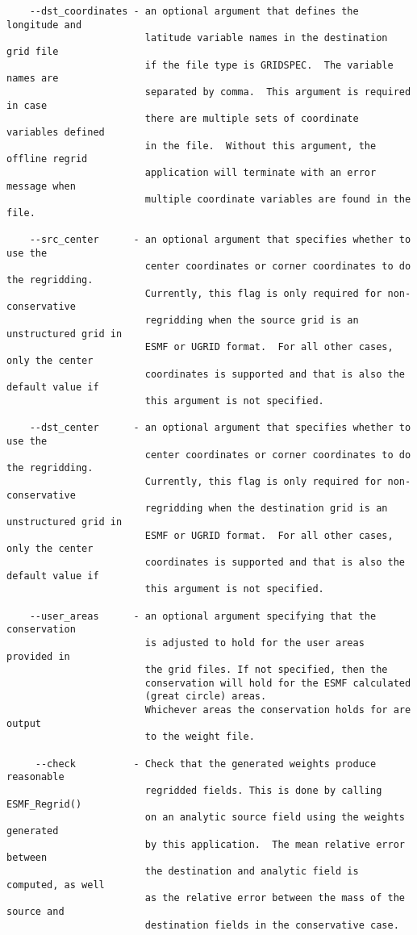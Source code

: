\begin{verbatim}
    --dst_coordinates - an optional argument that defines the longitude and
                        latitude variable names in the destination grid file
                        if the file type is GRIDSPEC.  The variable names are
                        separated by comma.  This argument is required in case
                        there are multiple sets of coordinate variables defined
                        in the file.  Without this argument, the offline regrid
                        application will terminate with an error message when
                        multiple coordinate variables are found in the file.

    --src_center      - an optional argument that specifies whether to use the 
                        center coordinates or corner coordinates to do the regridding.
                        Currently, this flag is only required for non-conservative
                        regridding when the source grid is an unstructured grid in 
                        ESMF or UGRID format.  For all other cases, only the center
                        coordinates is supported and that is also the default value if
                        this argument is not specified.

    --dst_center      - an optional argument that specifies whether to use the 
                        center coordinates or corner coordinates to do the regridding.
                        Currently, this flag is only required for non-conservative
                        regridding when the destination grid is an unstructured grid in 
                        ESMF or UGRID format.  For all other cases, only the center
                        coordinates is supported and that is also the default value if
                        this argument is not specified.

    --user_areas      - an optional argument specifying that the conservation
                        is adjusted to hold for the user areas provided in
                        the grid files. If not specified, then the 
                        conservation will hold for the ESMF calculated 
                        (great circle) areas.
                        Whichever areas the conservation holds for are output
                        to the weight file.

     --check          - Check that the generated weights produce reasonable 
                        regridded fields. This is done by calling ESMF_Regrid() 
                        on an analytic source field using the weights generated 
                        by this application.  The mean relative error between 
                        the destination and analytic field is computed, as well 
                        as the relative error between the mass of the source and 
                        destination fields in the conservative case.


\end{verbatim}
